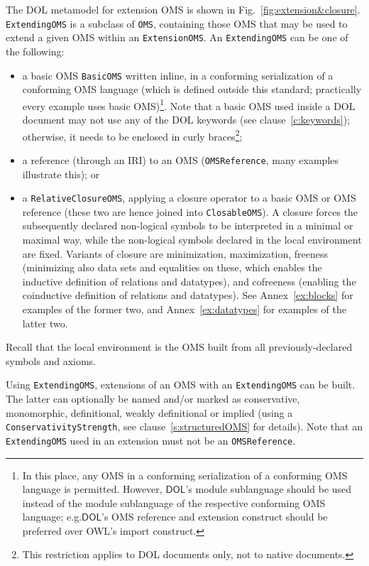\documentclass[10pt, a4paper]{isov2}
\makeatletter
\newcommand*{\eg}{e.g.\@\xspace}
\newcommand*{\syntax}[1]{\texttt{#1}}
\newcommand*{\DOL}{\ensuremath{\mathsf{DOL}}\xspace}
\makeatother
\begin{document}
The DOL metamodel for extension OMS is shown in Fig.~\ref{fig:extension&closure}.
\syntax{ExtendingOMS} is a subclass of \syntax{OMS}, containing
those OMS that may be used to extend a given OMS within an \syntax{ExtensionOMS}.
An \syntax{ExtendingOMS} can be one of the following:
\begin{itemize}
\item a basic OMS \syntax{BasicOMS} written inline, in a conforming serialization of a conforming OMS 
language (which is defined outside this standard; practically every example uses basic OMS)\footnote{In this place, any OMS in a conforming serialization of a conforming OMS language is permitted.  
However, \DOL's module sublanguage should be used instead of the module sublanguage of 
the respective conforming OMS language; \eg \DOL's OMS reference and extension construct should be preferred over OWL's import construct.}.
Note that a basic OMS used inside a DOL document may not use any of the DOL
keywords (see clause~\ref{c:keywords}); otherwise, it needs to be enclosed in curly braces\footnote{This restriction applies to DOL documents only,
 not to native documents.};
\item a reference (through an IRI) to an OMS (\syntax{OMSReference}, many examples illustrate this); or
\item a \syntax{RelativeClosureOMS}, applying a closure operator to a
  basic OMS or OMS reference (these two are hence joined into
  \syntax{ClosableOMS}). A closure forces the subsequently declared
  non-logical symbols to be interpreted in a minimal  or
  maximal way, while the non-logical symbols declared  in
  the local environment are fixed. Variants of closure are
  minimization, maximization, freeness (minimizing also data
  sets and equalities on these,  which enables the inductive
  definition of relations and datatypes), and cofreeness (enabling the
  coinductive definition of relations and datatypes).
  See Annex~\ref{ex:blocks} for examples of the former two, and
  Annex~\ref{ex:datatypes} for examples of the latter two.
\end{itemize}
Recall that the local environment is the OMS built from all
previously-declared symbols and axioms.

Using \syntax{ExtendingOMS}, extensions of an OMS with an \syntax{ExtendingOMS}
can be built. The latter can optionally be named and/or marked as conservative, monomorphic, definitional, weakly definitional or implied (using a \syntax{ConservativityStrength}, see clause~\ref{s:structuredOMS} for details).
Note that an \syntax{ExtendingOMS} used in an extension must
not be an \syntax{OMSReference}.
\end{document}
